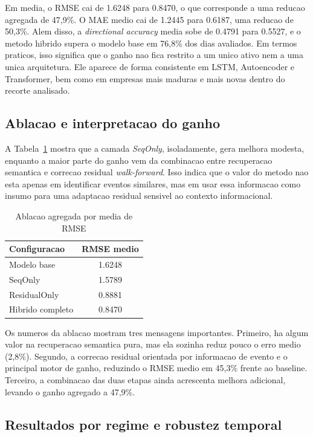 \documentclass[12pt]{article}
\begin{document}
Em media, o RMSE cai de 1.6248 para 0.8470, o que corresponde a uma reducao agregada de 47,9\%. O MAE medio cai de 1.2445 para 0.6187, uma reducao de 50,3\%. Alem disso, a \textit{directional accuracy} media sobe de 0.4791 para 0.5527, e o metodo hibrido supera o modelo base em 76,8\% dos dias avaliados. Em termos praticos, isso significa que o ganho nao fica restrito a um unico ativo nem a uma unica arquitetura. Ele aparece de forma consistente em LSTM, Autoencoder e Transformer, bem como em empresas mais maduras e mais novas dentro do recorte analisado.

\subsection{Ablacao e interpretacao do ganho}

A Tabela~\ref{tab:ablacao} mostra que a camada \textit{SeqOnly}, isoladamente, gera melhora modesta, enquanto a maior parte do ganho vem da combinacao entre recuperacao semantica e correcao residual \textit{walk-forward}. Isso indica que o valor do metodo nao esta apenas em identificar eventos similares, mas em usar essa informacao como insumo para uma adaptacao residual sensivel ao contexto informacional.

\begin{table}[H]
\centering
\caption{Ablacao agregada por media de RMSE}
\label{tab:ablacao}
\begin{tabular}{l c}
\toprule
\textbf{Configuracao} & \textbf{RMSE medio} \\
\midrule
Modelo base      & 1.6248 \\
SeqOnly          & 1.5789 \\
ResidualOnly     & 0.8881 \\
Hibrido completo & 0.8470 \\
\bottomrule
\end{tabular}
\end{table}

Os numeros da ablacao mostram tres mensagens importantes. Primeiro, ha algum valor na recuperacao semantica pura, mas ela sozinha reduz pouco o erro medio (2,8\%). Segundo, a correcao residual orientada por informacao de evento e o principal motor de ganho, reduzindo o RMSE medio em 45,3\% frente ao baseline. Terceiro, a combinacao das duas etapas ainda acrescenta melhora adicional, levando o ganho agregado a 47,9\%.

\subsection{Resultados por regime e robustez temporal}
\end{document}
